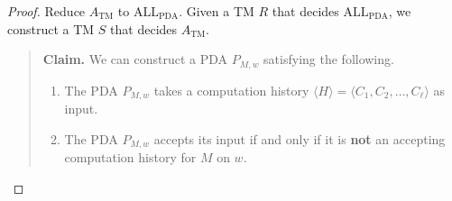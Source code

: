 \begin{proof}
    Reduce $A_{\mathrm{TM}}$ to $\mathrm{ALL}_{\mathrm{PDA}}$.
    Given a TM $R$ that decides $\mathrm{ALL}_{\mathrm{PDA}}$,
    we construct a TM $S$ that decides $A_{\mathrm{TM}}$.
    \begin{quote}
        \textbf{Claim.}
        We can construct a PDA $P_{M, w}$ satisfying the following.
        \begin{enumerate}
            \item The PDA $P_{M, w}$ takes a computation history
            $\langle H \rangle = \langle C_1, C_2, \dots, C_{\ell} \rangle$
            as input.
            \item The PDA $P_{M, w}$ accepts its input if and only if
            it is \textbf{not} an accepting computation history for $M$ on $w$.
        \end{enumerate}


\end{quote}
\end{proof}
